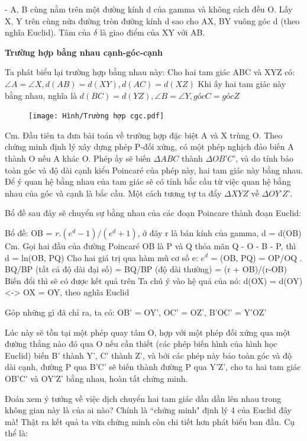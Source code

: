\begin{multicols}{2}
	- A, B cùng nằm trên một đường kính d của gamma và không cách đều O. Lấy X, Y trên cùng nửa đường tròn đường kính d sao cho AX, BY vuông góc d (theo nghĩa Euclid). Tâm của $\delta$ là giao điểm của XY với AB.
	
	\textbf{\color{lichsutoanhoc}Trường hợp bằng nhau cạnh-góc-cạnh}
	
	Ta phát biểu lại trường hợp bằng nhau này:
	Cho hai tam giác ABC và XYZ có: $ \angle A = \angle X, d(AB) = d(XY), d(AC) = d(XZ)$
	Khi ấy hai tam giác này bằng nhau, nghĩa là $d(BC)  = d(YZ), \angle B = \angle Y, góc C = góc Z$
	
	\begin{figure}[ht]
		\texttt{[image: Hình/Trường hợp cgc.pdf]}
	\end{figure}
	
	
	Cm. Đầu tiên ta đưa bài toán về trường hợp đặc biệt A và X trùng O.
	Theo chứng minh định lý xây dựng phép P-đối xứng, có một phép nghịch đảo biến A thành O nếu A khác O. Phép ấy sẽ biến $\Delta ABC$ thành $\Delta OB’C’$, và do tính bảo toàn góc và độ dài cạnh kiểu Poincaré của phép này, hai tam giác này bằng nhau. Để ý quan hệ bằng nhau của tam giác sẽ có tính bắc cầu từ việc quan hệ bằng nhau của góc và cạnh là bắc cầu. Một cách tương tự ta đẩy $\Delta XYZ$ về $ \Delta OY’Z’$.
	
	Bổ đề sau đây sẽ chuyển sự bằng nhau của các đoạn Poincare thành đoạn Euclid:
	
	Bổ đề: OB = $r.(e^d -1)/(e^d+1)$, ở đây r là bán kính của gamma, d = d(OB)
	Cm. Gọi hai đầu của đường Poincaré OB là P và Q thỏa mãn Q - O - B - P, thì d = ln(OB, PQ)
	Cho hai giá trị qua hàm mũ cơ số e:
	$e^d$ = (OB, PQ) = OP/OQ . BQ/BP (tất cả độ dài đại số) = BQ/BP (độ dài thường) = (r + OB)/(r-OB)
	Biến đổi thì sẽ có được kết quả trên
	Ta chú ý vào hệ quả của nó: d(OX) = d(OY) <-> OX = OY, theo nghĩa Euclid
	
	Góp những gì đã chỉ ra, ta có: OB’ = OY’, OC’ = OZ’, B’OC’ = Y’OZ’
	
	Lúc này sẽ tồn tại một phép quay tâm O, hợp với một phép đối xứng qua một đường thẳng nào đó qua O nếu cần thiết (các phép biến hình của hình học Euclid) biến B’ thành Y’, C’ thành Z’, và bởi các phép này bảo toàn góc và độ dài cạnh, đường P qua B’C’ sẽ biến thành đường P qua Y’Z’, cho ta hai tam giác OB’C’ và OY’Z’ bằng nhau, hoàn tất chứng minh.
	
	Đoán xem ý tưởng về việc dịch chuyển hai tam giác dần dần lên nhau trong không gian này là của ai nào? Chính là ``chứng minh" định lý 4 của Euclid đây mà!
	Thật ra kết quả ta vừa chứng minh còn chi tiết hơn phát biểu ban đầu. Cụ thể là:
	

\end{multicols}
